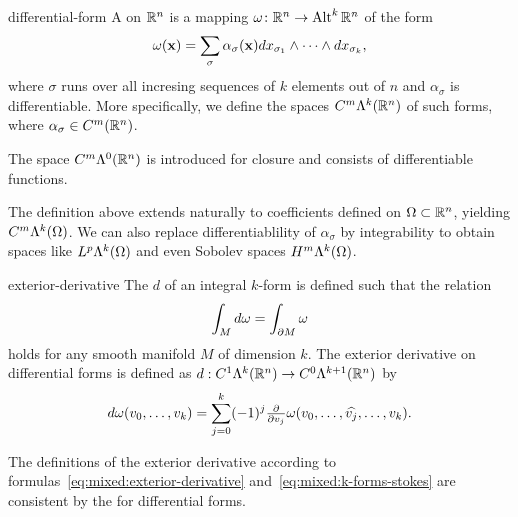 \begin{Definition}{differential-form}
  A  on $\mathbb R^n$ is a mapping
  $\omega\colon \mathbb R^n \to \operatorname{Alt}^k\mathbb R^n$ of the form
  \begin{gather}
    \omega(\mathbf x) = \sum_{\sigma} \alpha_{\sigma}(\mathbf x)
    dx_{\sigma_1}\wedge\dots\wedge dx_{\sigma_k},
  \end{gather}
  where $\sigma$ runs over all incresing sequences of $k$ elements out
  of $n$ and $\alpha_\sigma$ is differentiable. More specifically, we
  define the spaces $C^m\Lambda^k(\mathbb R^n)$ of such forms, where
  $\alpha_\sigma \in C^m(\mathbb R^n)$.

  The space $C^m\Lambda^0(\mathbb R^n)$ is introduced for closure and
  consists of differentiable functions.
\end{Definition}

\begin{remark}
  The definition above extends naturally to coefficients defined on
  $\Omega\subset\mathbb R^n$, yielding $C^m\Lambda^k(\Omega)$. We can also
  replace differentiablility of $\alpha_\sigma$ by integrability to
  obtain spaces like $L^p\Lambda^k(\Omega)$ and even Sobolev spaces
  $H^m\Lambda^k(\Omega)$.
\end{remark}

\begin{Definition}{exterior-derivative}
  The  $d$ of an integral $k$-form is
  defined such that the relation
  \begin{gather}
    \label{eq:mixed:k-forms-stokes}
    \int_M d\omega = \int_{\partial M} \omega
  \end{gather}
  holds for any smooth manifold $M$ of dimension $k$. The exterior
  derivative on differential forms is defined as
  $d:C^1\Lambda^k(\mathbb R^n) \to C^0\Lambda^{k+1}(\mathbb R^n)$ by
  \begin{gather}
    \label{eq:mixed:exterior-derivative}
    d\omega(v_0,\dots,v_{k})
    = \sum_{j=0}^k (-1)^j \tfrac{\partial}{\partial v_j} \omega(v_0,\dots,\widehat{v_j},\dots,v_k).
  \end{gather}
\end{Definition}

\begin{remark}
  The definitions of the exterior derivative according to
  formulas~\eqref{eq:mixed:exterior-derivative}
  and~\eqref{eq:mixed:k-forms-stokes} are consistent by the
   for differential forms.
\end{remark}

